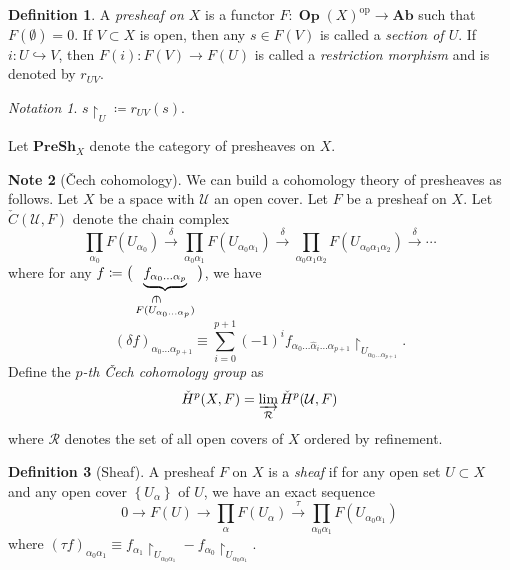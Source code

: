 \documentclass[10pt,letterpaper,cm]{nupset}
\theoremstyle{definition}
\newtheorem{definition}{Definition}[subsection]
\newtheorem{note}[definition]{Note}
\theoremstyle{theorem}
\theoremstyle{remark}
\newtheorem*{notation}{Notation}
\newcommand{\1}{\mathbb{1}}
\newcommand{\0}{\vec 0}
\DeclareMathOperator{\op}{op}
\DeclareMathOperator{\Op}{\mathbf{Op}}
\begin{document}
\begin{definition}
 A \textit{presheaf on $X$} is a functor $F: \Op(X)^{\op} \to \mathbf{Ab}$ such that $F(\emptyset) =0$. If $V\subset X$ is open, then any $s\in F(V)$ is called a \textit{section of $U$}. If $i : U \hookrightarrow V$, then $F(i): F(V) \to F(U)$ is called a \textit{restriction morphism} and is denoted by $r_{UV}$. 
\end{definition}

\begin{notation}
$s \restriction_U \coloneqq r_{UV}(s)$.
\end{notation}

\smallskip

Let $\mathbf{PreSh}_X$ denote the category of presheaves on $X$.

\newcommand{\invin}{%
\mathrel{\reflectbox{\rotatebox[origin=c]{270}{$\in$}}}}

\begin{note}[\v{C}ech cohomology]
We can build a cohomology theory of presheaves as follows. Let $X$ be a space with $\mathcal{U}$ an open cover. Let $F$ be a presheaf on $X$.  Let $\check{C}(\mathcal{U}, F)$ denote the chain complex
$$   \prod_{\alpha_0}F(U_{\alpha_0}) \overset{\delta}{\longrightarrow} \prod_{\alpha_0\alpha_1} F(U_{\alpha_0 \alpha_1}) \overset{\delta}{\longrightarrow} \prod_{\alpha_0\alpha_1\alpha_2}F(U_{\alpha_0\alpha_1\alpha_2}) \overset{\delta}{\longrightarrow} \cdots 
$$  where for any $f \coloneqq \big(\underbrace{f_{\alpha_0\ldots \alpha_p}}_{\overset{\invin}{F(U_{\alpha_0\ldots \alpha_p})}}\big)$, we have $$\left(\delta{f}\right)_{\alpha_0 \ldots \alpha_{p+1}} \equiv \sum_{i=0}^{p+1} ({-1})^i f_{\alpha_0 \ldots \hat{\alpha}_i \ldots \alpha_{p+1}} \restriction_{U_{\alpha_0\ldots \alpha_{p+1}}}.$$ Define the \textit{$p$-th \v{C}ech cohomology group} as $$\check{H}^p(X, F) = \varinjlim_{\mathcal{R}} \check{H}^p(\mathcal{U}, F)  $$ where $\mathcal{R}$ denotes the set of all open covers of $X$ ordered by refinement. 
\end{note}

\smallskip

\begin{definition}[Sheaf]
A presheaf $F$ on $X$ is a \textit{sheaf} if for any open set $U \subset X$ and any open cover $\left\{U_{\alpha}\right\}$ of $U$, we have an exact sequence $$    0 \to F(U) \to \prod_{\alpha} F(U_{\alpha}) \overset{\tau}{\longrightarrow} \prod _{\alpha_0\alpha_1} F(U_{\alpha_0 \alpha_1})  $$ where $\left(\tau{f}\right)_{\alpha_0 \alpha_1} \equiv f_{\alpha_1}\restriction_{U_{\alpha_0\alpha_1}} - f_{\alpha_0} \restriction_{U_{\alpha_0\alpha_1}}$.
\end{definition}
\end{document}
